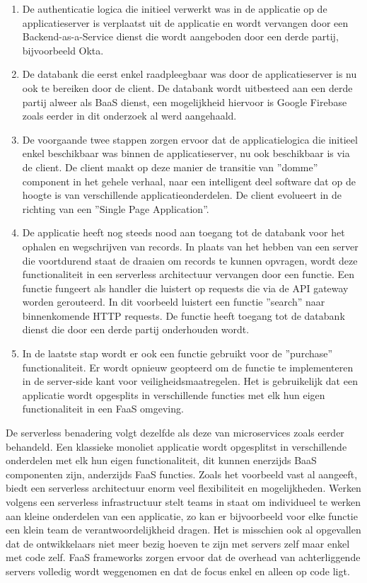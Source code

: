 \begin{enumerate}
    \item De authenticatie logica die initieel verwerkt was in de applicatie op de applicatieserver is verplaatst uit de applicatie en wordt vervangen door een Backend-as-a-Service dienst die wordt aangeboden door een derde partij, bijvoorbeeld Okta.
    \item De databank die eerst enkel raadpleegbaar was door de applicatieserver is nu ook te bereiken door de client. De databank wordt uitbesteed aan een derde partij alweer als BaaS dienst, een mogelijkheid hiervoor is Google Firebase zoals eerder in dit onderzoek al werd aangehaald.
    \item De voorgaande twee stappen zorgen ervoor dat de applicatielogica die initieel enkel beschikbaar was binnen de applicatieserver, nu ook beschikbaar is via de client. De client maakt op deze manier de transitie van ''domme'' component in het gehele verhaal, naar een intelligent deel software dat op de hoogte is van verschillende applicatieonderdelen. De client evolueert in de richting van een ''Single Page Application''. 
    \item De applicatie heeft nog steeds nood aan toegang tot de databank voor het ophalen en wegschrijven van records. In plaats van het hebben van een server die voortdurend staat de draaien om records te kunnen opvragen, wordt deze functionaliteit in een serverless architectuur vervangen door een functie. Een functie fungeert als handler die luistert op requests die via de API gateway worden gerouteerd. In dit voorbeeld luistert een functie ''search'' naar binnenkomende HTTP requests. De functie heeft toegang tot de databank dienst die door een derde partij onderhouden wordt.
    \item In de laatste stap wordt er ook een functie gebruikt voor de ''purchase'' functionaliteit. Er wordt opnieuw geopteerd om de functie te implementeren in de server-side kant voor veiligheidsmaatregelen. Het is gebruikelijk dat een applicatie wordt opgesplits in verschillende functies met elk hun eigen functionaliteit in een FaaS omgeving.
\end{enumerate}

De serverless benadering volgt dezelfde als deze van microservices zoals eerder behandeld. Een klassieke monoliet applicatie wordt opgesplitst in verschillende onderdelen met elk hun eigen functionaliteit, dit kunnen enerzijds BaaS componenten zijn, anderzijds FaaS functies. Zoals het voorbeeld vast al aangeeft, biedt een serverless architectuur enorm veel flexibiliteit en mogelijkheden. Werken volgens een serverless infrastructuur stelt teams in staat om individueel te werken aan kleine onderdelen van een applicatie, zo kan er bijvoorbeeld voor elke functie een klein team de verantwoordelijkheid dragen. Het is misschien ook al opgevallen dat de ontwikkelaars niet meer bezig hoeven te zijn met servers zelf maar enkel met code zelf. FaaS frameworks zorgen ervoor dat de overhead van achterliggende servers volledig wordt weggenomen en dat de focus enkel en alleen op code ligt.

